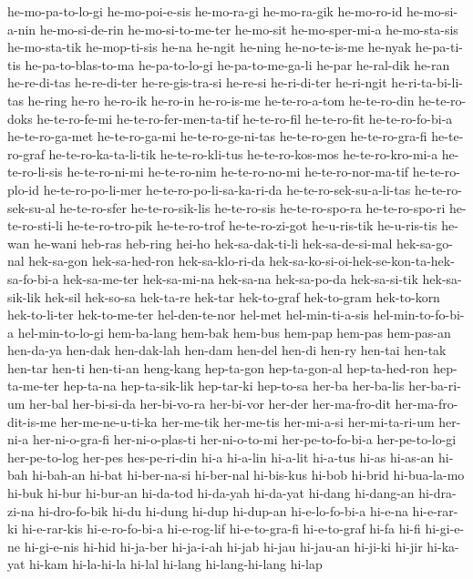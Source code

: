 {he-mo-pa-to-lo-gi he-mo-poi-e-sis he-mo-ra-gi he-mo-ra-gik he-mo-ro-id
he-mo-si-a-nin he-mo-si-de-rin he-mo-si-to-me-ter he-mo-sit
he-mo-sper-mi-a he-mo-sta-sis he-mo-sta-tik he-mop-ti-sis he-na he-ngit
he-ning he-no-te-is-me he-nyak he-pa-ti-tis he-pa-to-blas-to-ma
he-pa-to-lo-gi he-pa-to-me-ga-li he-par he-ral-dik he-ran he-re-di-tas
he-re-di-ter he-re-gis-tra-si he-re-si he-ri-di-ter he-ri-ngit
he-ri-ta-bi-li-tas he-ring he-ro he-ro-ik he-ro-in he-ro-is-me
he-te-ro-a-tom he-te-ro-din he-te-ro-doks he-te-ro-fe-mi
he-te-ro-fer-men-ta-tif he-te-ro-fil he-te-ro-fit he-te-ro-fo-bi-a
he-te-ro-ga-met he-te-ro-ga-mi he-te-ro-ge-ni-tas he-te-ro-gen
he-te-ro-gra-fi he-te-ro-graf he-te-ro-ka-ta-li-tik he-te-ro-kli-tus
he-te-ro-kos-mos he-te-ro-kro-mi-a he-te-ro-li-sis he-te-ro-ni-mi
he-te-ro-nim he-te-ro-no-mi he-te-ro-nor-ma-tif he-te-ro-plo-id
he-te-ro-po-li-mer he-te-ro-po-li-sa-ka-ri-da he-te-ro-sek-su-a-li-tas
he-te-ro-sek-su-al he-te-ro-sfer he-te-ro-sik-lis he-te-ro-sis
he-te-ro-spo-ra he-te-ro-spo-ri he-te-ro-sti-li he-te-ro-tro-pik
he-te-ro-trof he-te-ro-zi-got he-u-ris-tik he-u-ris-tis he-wan he-wani
heb-ras heb-ring hei-ho hek-sa-dak-ti-li hek-sa-de-si-mal hek-sa-go-nal
hek-sa-gon hek-sa-hed-ron hek-sa-klo-ri-da
hek-sa-ko-si-oi-hek-se-kon-ta-hek-sa-fo-bi-a hek-sa-me-ter hek-sa-mi-na
hek-sa-na hek-sa-po-da hek-sa-si-tik hek-sa-sik-lik hek-sil hek-so-sa
hek-ta-re hek-tar hek-to-graf hek-to-gram hek-to-korn hek-to-li-ter
hek-to-me-ter hel-den-te-nor hel-met hel-min-ti-a-sis hel-min-to-fo-bi-a
hel-min-to-lo-gi hem-ba-lang hem-bak hem-bus hem-pap hem-pas hem-pas-an
hen-da-ya hen-dak hen-dak-lah hen-dam hen-del hen-di hen-ry hen-tai
hen-tak hen-tar hen-ti hen-ti-an heng-kang hep-ta-gon hep-ta-gon-al
hep-ta-hed-ron hep-ta-me-ter hep-ta-na hep-ta-sik-lik hep-tar-ki hep-to-sa
her-ba her-ba-lis her-ba-ri-um her-bal her-bi-si-da her-bi-vo-ra
her-bi-vor her-der her-ma-fro-dit her-ma-fro-dit-is-me her-me-ne-u-ti-ka
her-me-tik her-me-tis her-mi-a-si her-mi-ta-ri-um her-ni-a her-ni-o-gra-fi
her-ni-o-plas-ti her-ni-o-to-mi her-pe-to-fo-bi-a her-pe-to-lo-gi
her-pe-to-log her-pes hes-pe-ri-din hi-a hi-a-lin hi-a-lit hi-a-tus hi-as
hi-as-an hi-bah hi-bah-an hi-bat hi-ber-na-si hi-ber-nal hi-bis-kus hi-bob
hi-brid hi-bua-la-mo hi-buk hi-bur hi-bur-an hi-da-tod hi-da-yah hi-da-yat
hi-dang hi-dang-an hi-dra-zi-na hi-dro-fo-bik hi-du hi-dung hi-dup
hi-dup-an hi-e-lo-fo-bi-a hi-e-na hi-e-rar-ki hi-e-rar-kis hi-e-ro-fo-bi-a
hi-e-rog-lif hi-e-to-gra-fi hi-e-to-graf hi-fa hi-fi hi-gi-e-ne
hi-gi-e-nis hi-hid hi-ja-ber hi-ja-i-ah hi-jab hi-jau hi-jau-an hi-ji-ki
hi-jir hi-ka-yat hi-kam hi-la-hi-la hi-lal hi-lang hi-lang-hi-lang hi-lap
}
